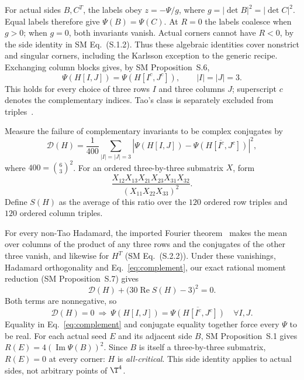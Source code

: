 For actual sides $B,C^T$, the labels obey $z=-\Psi/g$, where $g=|\det B|^2=|\det C|^2$. Equal labels therefore give $\Psi(B)=\Psi(C)$. At $R=0$ the labels coalesce when $g>0$; when $g=0$, both invariants vanish. Actual corners cannot have $R<0$, by the side identity in SM Eq.~(S.1.2). Thus these algebraic identities cover nonstrict and singular corners, including the Karlsson exception to the generic recipe. Exchanging column blocks gives, by SM Proposition~S.6,
\begin{equation}
 \Psi(H[I,J])=\Psi(H[I^c,J^c]),\qquad |I|=|J|=3.
 \label{eq:complement}
\end{equation}
This holds for every choice of three rows $I$ and three columns $J$; superscript $c$ denotes the complementary indices. Tao's class is separately excluded from triples~\cite{BrierleyWeigert2009}.

Measure the failure of complementary invariants to be complex conjugates by
\begin{equation}
 \mathcal D(H)=\frac1{400}\sum_{|I|=|J|=3}
 \left|\Psi(H[I,J])-\overline{\Psi(H[I^c,J^c])}\right|^2,
 \label{eq:defect}
\end{equation}
where $400=\binom63^2$. For an ordered three-by-three submatrix $X$, form
\[
 \frac{X_{12}X_{13}X_{21}X_{23}X_{31}X_{32}}
 {(X_{11}X_{22}X_{33})^2}.
\]
Define $S(H)$ as the average of this ratio over the $120$ ordered row triples and $120$ ordered column triples.

For every non-Tao Hadamard, the imported Fourier theorem~\cite{OAIFourier2026} makes the mean over columns of the product of any three rows and the conjugates of the other three vanish, and likewise for $H^T$ (SM Eq.~(S.2.2)). Under these vanishings, Hadamard orthogonality and Eq.~\eqref{eq:complement}, our exact rational moment reduction (SM Proposition~S.7) gives
\begin{equation}
 \mathcal D(H)+\bigl(30\operatorname{Re}S(H)-3\bigr)^2=0.
 \label{eq:sos}
\end{equation}
Both terms are nonnegative, so
\[
 \mathcal D(H)=0\ \Longrightarrow\
 \Psi(H[I,J])=\overline{\Psi(H[I^c,J^c])}\quad\forall I,J.
\]
Equality in Eq.~\eqref{eq:complement} and conjugate equality together force every $\Psi$ to be real. For each actual seed $E$ and its adjacent side $B$, SM Proposition~S.1 gives $R(E)=4(\operatorname{Im}\Psi(B))^2$. Since $B$ is itself a three-by-three submatrix, $R(E)=0$ at every corner: $H$ is \emph{all-critical}. This side identity applies to actual sides, not arbitrary points of $\T^4$.

